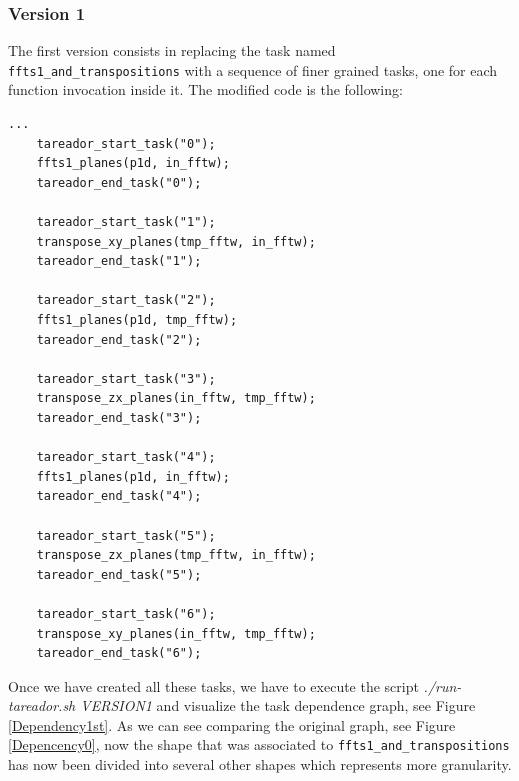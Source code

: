 \documentclass[12]{article}
\begin{document}
\subsubsection{Version 1}

The first version consists in replacing the task named \texttt{ffts1\_and\_transpositions} with a sequence of finer grained tasks, one for each function invocation inside it. The modified code is the following: 
\\
\begin{lstlisting}
...
    tareador_start_task("0");
    ffts1_planes(p1d, in_fftw);
    tareador_end_task("0");

    tareador_start_task("1");
    transpose_xy_planes(tmp_fftw, in_fftw);
    tareador_end_task("1");

    tareador_start_task("2");
    ffts1_planes(p1d, tmp_fftw);
    tareador_end_task("2");

    tareador_start_task("3");	
    transpose_zx_planes(in_fftw, tmp_fftw);
    tareador_end_task("3");
    
    tareador_start_task("4");
    ffts1_planes(p1d, in_fftw);
    tareador_end_task("4");

    tareador_start_task("5");
    transpose_zx_planes(tmp_fftw, in_fftw);
    tareador_end_task("5");

    tareador_start_task("6");
    transpose_xy_planes(in_fftw, tmp_fftw);
    tareador_end_task("6");
\end{lstlisting}

Once we have created all these tasks, we have to execute the script \textit{./run-tareador.sh VERSION1} and visualize the task dependence graph, see Figure \ref{Dependency1st}. As we can see comparing the original graph, see Figure \ref{Depencency0}, now the shape that was associated to \texttt{ffts1\_and\_transpositions} has now been divided into several other shapes which represents more granularity. 
\end{document}
